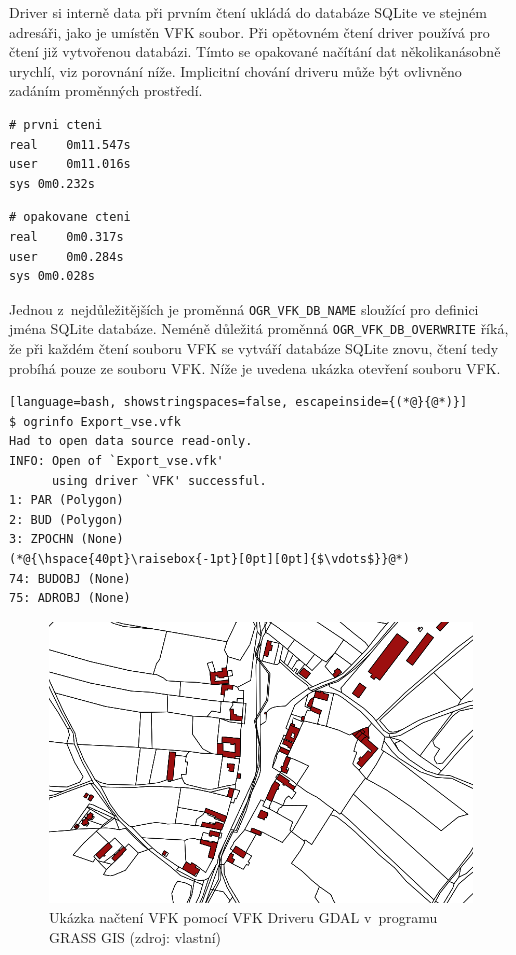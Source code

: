 \documentclass[a4paper,12pt,oneside]{book}
\begin{document}
Driver si interně data při prvním čtení ukládá do databáze SQLite ve
stejném adresáři, jako je umístěn VFK soubor. Při opětovném čtení
driver používá pro čtení již vytvořenou databázi. Tímto se opakované
načítání dat několikanásobně urychlí, viz porovnání níže. Implicitní
chování driveru může být ovlivněno zadáním proměnných prostředí.

\begin{multicols}{2}
\begin{lstlisting}
# prvni cteni
real	0m11.547s
user	0m11.016s
sys	0m0.232s
\end{lstlisting}
\columnbreak
\begin{lstlisting}
# opakovane cteni
real	0m0.317s
user	0m0.284s
sys	0m0.028s
\end{lstlisting}
\end{multicols}

Jednou z~nejdůležitějších je proměnná \texttt{OGR\_VFK\_DB\_NAME}
sloužící pro definici jména SQLite databáze. Neméně důležitá proměnná
\texttt{OGR\_VFK\_DB\_OVERWRITE} říká, že při každém čtení souboru VFK
se vytváří databáze SQLite znovu, čtení tedy probíhá pouze ze
souboru VFK. Níže je uvedena ukázka otevření souboru VFK. \cite{gdal_vfk}
\cite{landa_gis_ostrava_vfk}

\begin{lstlisting}[language=bash, showstringspaces=false, escapeinside={(*@}{@*)}]
$ ogrinfo Export_vse.vfk
Had to open data source read-only.
INFO: Open of `Export_vse.vfk'
      using driver `VFK' successful.
1: PAR (Polygon)
2: BUD (Polygon)
3: ZPOCHN (None)
(*@{\hspace{40pt}\raisebox{-1pt}[0pt][0pt]{$\vdots$}}@*)
74: BUDOBJ (None)
75: ADROBJ (None) 
\end{lstlisting}

\newpage

\begin{figure}[htbp]
\centering
\includegraphics[width=.7\textwidth]{images/grass_ukazka.png}
\caption[Ukázka načtení VFK pomocí VFK Driveru GDAL v~programu GRASS GIS]{Ukázka načtení VFK pomocí VFK Driveru GDAL v~programu GRASS GIS (zdroj: vlastní)}
\end{figure}
\end{document}
